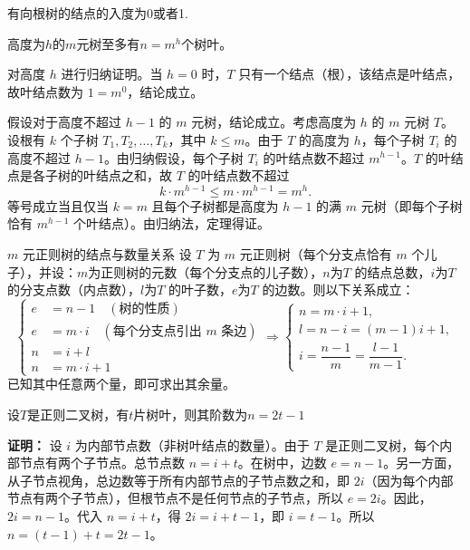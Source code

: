 有向根树的结点的入度为0或者1.

\begin{theorem}{}{}
    高度为$h$的$m$元树至多有$n=m^h$个树叶。
\end{theorem}
对高度 $h$ 进行归纳证明。当 $h=0$ 时，$T$ 只有一个结点（根），该结点是叶结点，故叶结点数为 $1 = m^0$，结论成立。

假设对于高度不超过 $h-1$ 的 $m$ 元树，结论成立。考虑高度为 $h$ 的 $m$ 元树 $T$。设根有 $k$ 个子树 $T_1, T_2, \dots, T_k$，其中 $k \le m$。由于 $T$ 的高度为 $h$，每个子树 $T_i$ 的高度不超过 $h-1$。由归纳假设，每个子树 $T_i$ 的叶结点数不超过 $m^{h-1}$。$T$ 的叶结点是各子树的叶结点之和，故 $T$ 的叶结点数不超过
    \[
    k \cdot m^{h-1} \le m \cdot m^{h-1} = m^h.
    \]
等号成立当且仅当 $k=m$ 且每个子树都是高度为 $h-1$ 的满 $m$ 元树（即每个子树恰有 $m^{h-1}$ 个叶结点）。由归纳法，定理得证。
\begin{theorem}{$m$ 元正则树的结点与数量关系}{}
设 $T$ 为 $m$ 元正则树（每个分支点恰有 $m$ 个儿子），并设：$m$为正则树的元数（每个分支点的儿子数），$n$为$T$ 的结点总数，$i$为$T$ 的分支点数（内点数），$l$为$T$ 的叶子数，$e$为$T$ 的边数。则以下关系成立：
\[\begin{cases}
    e &= n - 1 \quad (\text{树的性质}) \\[-3pt]
    e &= m \cdot i \quad (\text{每个分支点引出 $m$ 条边}) \\[-3pt]
    n &= i + l \\[-3pt]
    n &= m \cdot i + 1
\end{cases}
\Rightarrow
\begin{cases}
    n = m \cdot i + 1,\\[-3pt]
    l = n - i = (m-1)i + 1,\\
    i = \dfrac{n-1}{m} = \dfrac{l-1}{m-1}.
\end{cases}
\]
已知其中任意两个量，即可求出其余量。
\end{theorem}
\begin{example}{}{}
    设$T$是正则二叉树，有$t$片树叶，则其阶数为$n=2t-1$
\end{example}
\textbf{证明：} 设 $i$ 为内部节点数（非树叶结点的数量）。由于 $T$ 是正则二叉树，每个内部节点有两个子节点。总节点数 $n = i + t$。在树中，边数 $e = n - 1$。另一方面，从子节点视角，总边数等于所有内部节点的子节点数之和，即 $2i$（因为每个内部节点有两个子节点），但根节点不是任何节点的子节点，所以 $e = 2i$。因此，$2i = n - 1$。代入 $n = i + t$，得 $2i = i + t - 1$，即 $i = t - 1$。所以 $n = (t - 1) + t = 2t - 1$。

